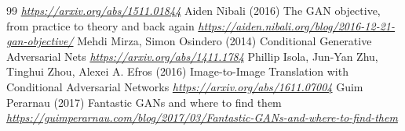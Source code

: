 \documentclass[11pt,compress,t,notes=noshow, xcolor=table]{beamer}
\begin{document}
\begin{vbframe}
{\begin{thebibliography}{99}
\newblock \emph{\url{https://arxiv.org/abs/1511.01844}}
 Aiden Nibali (2016)
\newblock The GAN objective, from practice to theory and back again
\newblock \emph{\url{https://aiden.nibali.org/blog/2016-12-21-gan-objective/}}
 Mehdi Mirza, Simon Osindero (2014)
\newblock Conditional Generative Adversarial Nets
\newblock \emph{\url{https://arxiv.org/abs/1411.1784}}
 Phillip Isola, Jun-Yan Zhu, Tinghui Zhou, Alexei A. Efros (2016)
\newblock Image-to-Image Translation with Conditional Adversarial Networks
\newblock \emph{\url{https://arxiv.org/abs/1611.07004}}
 Guim Perarnau (2017)
\newblock Fantastic GANs and where to find them
\newblock \emph{\url{https://guimperarnau.com/blog/2017/03/Fantastic-GANs-and-where-to-find-them}}


\end{thebibliography}
}
\end{vbframe}

\endlecture
\end{document}
